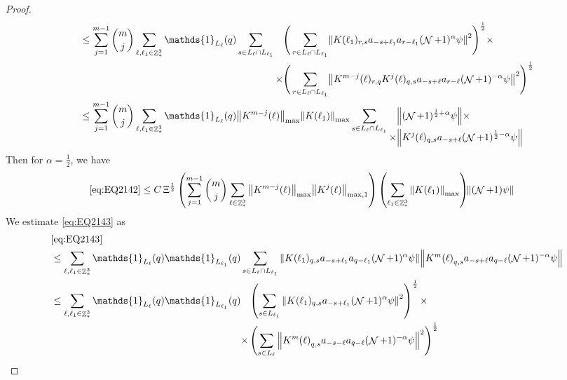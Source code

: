 \documentclass[sn-mathphys, Numbered ,a4paper]{sn-jnl}%
\DeclareMathOperator{\Z}{\mathbb{Z}}
\DeclareMathOperator{\NN}{\mathcal{N}}
\newcommand{\half}{\frac{1}{2}}
\theoremstyle{plain}
\theoremstyle{definition}
\theoremstyle{remark}
\theoremstyle{plain}
\theoremstyle{definition}
\theoremstyle{remark}
\begin{document}
{\begin{proof}
\begin{align}
		&\leq \sum\limits_{j=1}^{m-1} {{m}\choose j} \sum\limits_{\ell, \ell_1\in \Z^3_*} \mathds{1}_{L_{\ell}}(q)  \sum\limits_{s\in L_{\ell} \cap L_{\ell_1}}   \begin{aligned}[t] \Bigg(\sum\limits_{ r \in L_{\ell} \cap L_{\ell_1}}&\norm{ K(\ell_1)_{r,s}a_{-s+\ell_1} a_{r-\ell_1} (\NN+1)^{\alpha}\psi}^2\Bigg)^\half\nonumber \times \\ \times\Bigg(  \sum\limits_{ r \in L_{\ell} \cap L_{\ell_1}}&\norm{ K^{m-j}(\ell)_{r,q} K^{j}(\ell)_{q,s} a_{-s+\ell}a_{r-\ell} (\NN+1)^{-\alpha} \psi }^2\Bigg)^\half\end{aligned} \nonumber\\
		&\leq \sum\limits_{j=1}^{m-1} {{m}\choose j} \sum\limits_{\ell, \ell_1\in \Z^3_*} \mathds{1}_{L_{\ell}}(q) \norm{K^{m-j}(\ell)}_{\mathrm{max}} \norm{K(\ell_1)}_{\mathrm{max}}  \sum\limits_{s\in L_{\ell} \cap L_{\ell_1}} \begin{aligned}[t] &\norm{(\NN+1)^{\half+\alpha}\psi}\nonumber \times \\ \times&\norm{ K^j(\ell)_{q,s} a_{-s+\ell} (\NN+1)^{\half-\alpha} \psi }\end{aligned} \nonumber
	\end{align} 
	Then for $\alpha = \half$, we have
	\begin{align}
		\eqref{eq:EQ2142} &\leq  C \, \Xi^\half \left(  \sum\limits_{j=1}^{m-1} {{m}\choose j} \sum\limits_{\ell \in \Z^3_*} \norm{K^{m-j}(\ell)}_{\mathrm{max}} \norm{ K^{j}(\ell)}_{\mathrm{max,1}}\right) \left( \sum\limits_{ \ell_1\in \Z^3_*}\norm{ K(\ell_1) }_{\mathrm{max}} \right)\!\! \norm{(\NN+1) \psi }\label{eq:estEQ2142}
	\end{align}
	We estimate \eqref{eq:EQ2143} as 
	\begin{align}
		&\eqref{eq:EQ2143}\nonumber\\
		&\leq \sum\limits_{\ell, \ell_1\in \Z^3_*} \mathds{1}_{L_{\ell}}(q) \mathds{1}_{L_{\ell_1}}(q) \sum\limits_{ s \in L_{\ell} \cap L_{\ell_1}} \norm{K(\ell_1)_{q,s} a_{-s+\ell_1} a_{q-\ell_1}  (\NN+1)^{\alpha}\psi}\norm{ K^m{(\ell)}_{q,s}  a_{-s+\ell} a_{q-\ell} (\NN+1)^{-\alpha} \psi } \nonumber\\
		&\leq \sum\limits_{\ell, \ell_1\in \Z^3_*} \mathds{1}_{L_{\ell}}(q) \mathds{1}_{L_{\ell_1}}(q) \begin{aligned}[t]&\left(\sum\limits_{ s \in L_{\ell_1}} \norm{K(\ell_1)_{q,s} a_{-s+\ell_1} (\NN+1)^{\alpha}\psi}^2\right)^\half \times \nonumber\\ \times &\left( \sum\limits_{ s \in L_{\ell} } \norm{ K^m{(\ell)}_{q,s}  a_{-s-\ell} a_{q-\ell} (\NN+1)^{-\alpha} \psi }^2\right)^\half \end{aligned}\nonumber\\

\end{align}
\end{proof}}
\end{document}
